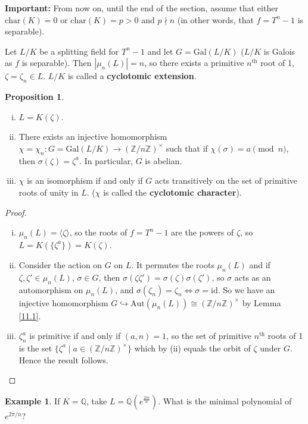 \documentclass{article}
\theoremstyle{definition}
\newtheorem{prop}[theorem]{Proposition}
\newtheorem{example}{Example}[section]
\begin{document}
\textbf{Important:} From now on, until the end of the section, assume that either $\text{char}(K)=0$ or $\text{char}(K)=p>0$ and $p \nmid n$ (in other words, that $f=T^n-1$ is separable).
\vspace{1mm}

Let $L/K$ be a splitting field for $T^n-1$ and let $G=\text{Gal}(L/K)$ ($L/K$ is Galois as $f$ is separable). Then $|\mu_n(L)|=n$, so there exists a primitive $n^{\text{th}}$ root of 1, $\zeta=\zeta_n \in L$. $L/K$ is called a \textbf{cyclotomic extension}.

\begin{prop}\label{11.2}
    \begin{enumerate}[(i)]
        \item $L=K(\zeta)$.
        \item There exists an injective homomorphism $\chi = \chi_n : G = \text{Gal}(L/K) \to (\mathbb{Z}/n\mathbb{Z})^\times$ such that if $\chi(\sigma)=a \pmod{n}$, then $\sigma(\zeta)=\zeta^a$. In particular, $G$ is abelian.
        \item $\chi$ is an isomorphism if and only if $G$ acts transitively on the set of primitive roots of unity in $L$. ($\chi$ is called the \textbf{cyclotomic character}).
    \end{enumerate}
\end{prop}
\begin{proof}
    \begin{enumerate}[(i)]
        \item $\mu_n(L)=\langle\zeta \rangle$, so the roots of $f=T^n-1$ are the powers of $\zeta$, so $L=K(\{\zeta^a\})=K(\zeta)$.
        \item Consider the action on $G$ on $L$. It permutes the roots $\mu_n(L)$ and if $\zeta,\zeta' \in \mu_n(L)$, $\sigma \in G$, then $\sigma(\zeta \zeta') = \sigma(\zeta)\sigma(\zeta')$, so $\sigma$ acts as an automorphism on $\mu_n(L)$, and $\sigma(\zeta_n)=\zeta_n \iff \sigma=\text{id}$. So we have an injective homomorphism $G \hookrightarrow \text{Aut}(\mu_n(L)) \cong (\mathbb{Z}/n\mathbb{Z})^\times$ by Lemma \ref{11.1}.
        \item $\zeta_n^a$ is primitive if and only if $(a,n)=1$, so the set of primitive $n^{\text{th}}$ roots of 1 is the set $\{\zeta^a \mid a \in (\mathbb{Z}/n\mathbb{Z})^\times\}$ which by (ii) equals the orbit of $\zeta$ under $G$. Hence the result follows.
    \end{enumerate}
\end{proof}
\begin{example}
    If $K=\mathbb{Q}$, take $L=\mathbb{Q}(e^{\frac{2 \pi i}{n}})$. What is the minimal polynomial of $e^{2\pi/n}$?
\end{example}
\end{document}
